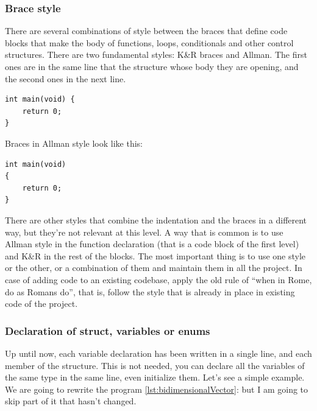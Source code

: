 \documentclass[a4paper]{article}
\begin{document}
\subsubsection{Brace style}
There are several combinations of style between the braces that define code
blocks that make the body of functions, loops, conditionals and other control
structures. There are two fundamental styles: K\&R braces and Allman. The first
ones are in the same line that the structure whose body they are opening, and
the second ones in the next line.

\noindent
\begin{minipage}[H]{\linewidth}
\mbox{}
\begin{lstlisting}[style=C,
caption={Example of braces in K\&R style},
label={lst:KRBrackets}]
int main(void) {
    return 0;
}
\end{lstlisting}
\end{minipage}

Braces in Allman style look like this:

\noindent
\begin{minipage}[H]{\linewidth}
\mbox{}
\begin{lstlisting}[style=C,
caption={Example of braces in Allman style},
label={lst:AllmanBrackets}]
int main(void)
{
    return 0;
}
\end{lstlisting}
\end{minipage}

There are other styles that combine the indentation and the braces in a
different way, but they're not relevant at this level. A way that is common is
to use Allman style in the function declaration (that is a code block of the
first level) and K\&R in the rest of the blocks. The most important thing is to
use one style or the other, or a combination of them and maintain them in all
the project. In case of adding code to an existing codebase, apply the old rule
of ``when in Rome, do as Romans do'', that is, follow the style that is already
in place in existing code of the project.

\subsubsection{Declaration of struct, variables or enums}
Up until now, each variable declaration has been written in a single line, and
each member of the structure. This is not needed, you can declare all the
variables of the same type in the same line, even initialize them. Let's see a
simple example. We are going to rewrite the program
\ref{lst:bidimensionalVector}: 
but I am going to skip part of it that hasn't changed.
\end{document}
